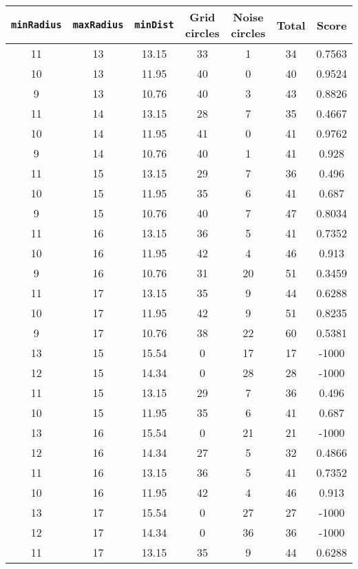 \documentclass[letterpaper, 12pt]{article}
\begin{document}
\begin{longtable}{|c|c|c|c|c|c|c|}
\hline
\textbf{\texttt{minRadius}} & \textbf{\texttt{maxRadius}} & \textbf{\texttt{minDist}} & \textbf{Grid circles} & \textbf{Noise circles} & \textbf{Total} & \textbf{Score} \\
\hline
11 & 13 & 13.15 & 33 & 1 & 34 & 0.7563 \\
\hline
10 & 13 & 11.95 & 40 & 0 & 40 & 0.9524 \\
\hline
9 & 13 & 10.76 & 40 & 3 & 43 & 0.8826 \\
\hline
11 & 14 & 13.15 & 28 & 7 & 35 & 0.4667 \\
\hline
10 & 14 & 11.95 & 41 & 0 & 41 & 0.9762 \\
\hline
9 & 14 & 10.76 & 40 & 1 & 41 & 0.928 \\
\hline
11 & 15 & 13.15 & 29 & 7 & 36 & 0.496 \\
\hline
10 & 15 & 11.95 & 35 & 6 & 41 & 0.687 \\
\hline
9 & 15 & 10.76 & 40 & 7 & 47 & 0.8034 \\
\hline
11 & 16 & 13.15 & 36 & 5 & 41 & 0.7352 \\
\hline
10 & 16 & 11.95 & 42 & 4 & 46 & 0.913 \\
\hline
9 & 16 & 10.76 & 31 & 20 & 51 & 0.3459 \\
\hline
11 & 17 & 13.15 & 35 & 9 & 44 & 0.6288 \\
\hline
10 & 17 & 11.95 & 42 & 9 & 51 & 0.8235 \\
\hline
9 & 17 & 10.76 & 38 & 22 & 60 & 0.5381 \\
\hline
13 & 15 & 15.54 & 0 & 17 & 17 & -1000 \\
\hline
12 & 15 & 14.34 & 0 & 28 & 28 & -1000 \\
\hline
11 & 15 & 13.15 & 29 & 7 & 36 & 0.496 \\
\hline
10 & 15 & 11.95 & 35 & 6 & 41 & 0.687 \\
\hline
13 & 16 & 15.54 & 0 & 21 & 21 & -1000 \\
\hline
12 & 16 & 14.34 & 27 & 5 & 32 & 0.4866 \\
\hline
11 & 16 & 13.15 & 36 & 5 & 41 & 0.7352 \\
\hline
10 & 16 & 11.95 & 42 & 4 & 46 & 0.913 \\
\hline
13 & 17 & 15.54 & 0 & 27 & 27 & -1000 \\
\hline
12 & 17 & 14.34 & 0 & 36 & 36 & -1000 \\
\hline
11 & 17 & 13.15 & 35 & 9 & 44 & 0.6288 \\
\hline

\end{longtable}
\end{document}
